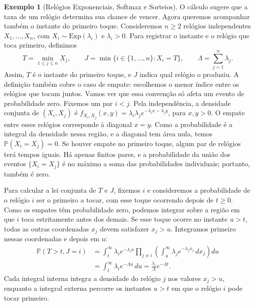\documentclass[12pt,portuguese]{article}
\theoremstyle{definition}
\newtheorem{example}[example]{Exemplo}
\theoremstyle{plainexercise}
\theoremstyle{starredexercise}
\theoremstyle{definition}
\begin{document}
\begin{example}[Relógios Exponenciais, Softmax e Sorteios]
O cálculo sugere que a taxa de um relógio determina sua chance de vencer.
Agora queremos acompanhar também o instante do primeiro toque. Consideremos
$n\geqslant2$ relógios independentes $X_1,\ldots,X_n$, com
$X_i\sim\mathrm{Exp}(\lambda_i)$ e $\lambda_i>0$. Para registrar o instante
e o relógio que toca primeiro, definimos
\[
  T=\min_{1\leqslant j\leqslant n}X_j,
  \qquad
  J=\min\{i\in\{1,\ldots,n\}:X_i=T\},
  \qquad
  \Lambda=\sum_{j=1}^n\lambda_j.
\]
Assim, $T$ é o instante do primeiro toque, e $J$ indica qual relógio o
produziu. A definição também cobre o caso de empate: escolhemos o menor índice
entre os relógios que tocam juntos. Vamos ver que essa convenção só afeta um
evento de probabilidade zero. Fixemos um par $i<j$. Pela independência, a
densidade conjunta de $(X_i,X_j)$ é
$f_{X_i,X_j}(x,y)=\lambda_i\lambda_j e^{-\lambda_i x-\lambda_j y}$, para
$x,y>0$. O empate entre esses relógios corresponde à diagonal $x=y$. Como a
probabilidade é a integral da densidade nessa região, e a diagonal tem área
nula, temos $\mathbb{P}(X_i=X_j)=0$. Se houver empate no primeiro toque,
algum par de relógios terá tempos iguais. Há apenas finitos pares, e a
probabilidade da união dos eventos $\{X_i=X_j\}$ é no máximo a soma das
probabilidades individuais; portanto, também é zero.

Para calcular a lei conjunta de $T$ e $J$, fixemos $i$ e consideremos a
probabilidade de o relógio $i$ ser o primeiro a tocar, com esse toque ocorrendo
depois de $t\geqslant0$.
Como os empates têm probabilidade zero, podemos integrar sobre a região em que
$i$ toca estritamente antes dos demais. Se esse toque ocorre no instante
$u>t$, todas as outras coordenadas $x_j$ devem satisfazer $x_j>u$. Integramos
primeiro nessas coordenadas e depois em $u$:
\begin{align}\label{eq-aux1-ex-corrida-despertadores}
  \mathbb{P}(T>t, J=i)
  &= \int_t^\infty
  \lambda_i e^{-\lambda_i u}
  \prod_{j\ne i}\left(\int_u^\infty
  \lambda_j e^{-\lambda_j x_j}\,dx_j\right)du
  \nonumber\\[0.3cm]
  &= \int_t^\infty \lambda_i e^{-\Lambda u}\,du
  = \frac{\lambda_i}{\Lambda}e^{-\Lambda t}.
\end{align}
Cada integral interna integra a densidade do relógio $j$ nos valores $x_j>u$,
enquanto a integral externa percorre os instantes $u>t$ em que o relógio $i$
pode tocar primeiro.


\end{example}
\end{document}
